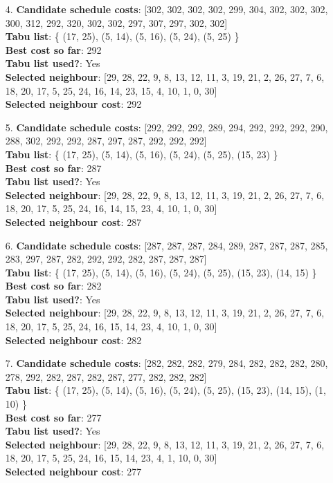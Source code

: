 \documentclass[fleqn]{article}
\begin{document}
\begin{itemize}
    \item[4.] \textbf{Candidate schedule costs}: [302, 302, 302, 302, 299, 304, 302, 302, 302, 300, 312, 292, 320, 302, 302, 297, 307, 297, 302, 302] \\
    \textbf{Tabu list}: \{ (17, 25), (5, 14), (5, 16), (5, 24), (5, 25) \} \\
    \textbf{Best cost so far}: 292 \\
    \textbf{Tabu list used?}: Yes \\
    \textbf{Selected neighbour}: [29, 28, 22, 9, 8, 13, 12, 11, 3, 19, 21, 2, 26, 27, 7, 6, 18, 20, 17, 5, 25, 24, 16, 14, 23, 15, 4, 10, 1, 0, 30] \\
    \textbf{Selected neighbour cost}: 292
      

    \item[5.] \textbf{Candidate schedule costs}: [292, 292, 292, 289, 294, 292, 292, 292, 290, 288, 302, 292, 292, 287, 297, 287, 292, 292, 292] \\
    \textbf{Tabu list}: \{ (17, 25), (5, 14), (5, 16), (5, 24), (5, 25), (15, 23) \} \\
    \textbf{Best cost so far}: 287 \\
    \textbf{Tabu list used?}: Yes \\
    \textbf{Selected neighbour}: [29, 28, 22, 9, 8, 13, 12, 11, 3, 19, 21, 2, 26, 27, 7, 6, 18, 20, 17, 5, 25, 24, 16, 14, 15, 23, 4, 10, 1, 0, 30] \\
    \textbf{Selected neighbour cost}: 287
      

    \item[6.] \textbf{Candidate schedule costs}: [287, 287, 287, 284, 289, 287, 287, 287, 285, 283, 297, 287, 282, 292, 292, 282, 287, 287, 287] \\
    \textbf{Tabu list}: \{ (17, 25), (5, 14), (5, 16), (5, 24), (5, 25), (15, 23), (14, 15) \} \\
    \textbf{Best cost so far}: 282 \\
    \textbf{Tabu list used?}: Yes \\
    \textbf{Selected neighbour}: [29, 28, 22, 9, 8, 13, 12, 11, 3, 19, 21, 2, 26, 27, 7, 6, 18, 20, 17, 5, 25, 24, 16, 15, 14, 23, 4, 10, 1, 0, 30] \\
    \textbf{Selected neighbour cost}: 282
      

    \item[7.] \textbf{Candidate schedule costs}: [282, 282, 282, 279, 284, 282, 282, 282, 280, 278, 292, 282, 287, 282, 287, 277, 282, 282, 282] \\
    \textbf{Tabu list}: \{ (17, 25), (5, 14), (5, 16), (5, 24), (5, 25), (15, 23), (14, 15), (1, 10) \} \\
    \textbf{Best cost so far}: 277 \\
    \textbf{Tabu list used?}: Yes \\
    \textbf{Selected neighbour}: [29, 28, 22, 9, 8, 13, 12, 11, 3, 19, 21, 2, 26, 27, 7, 6, 18, 20, 17, 5, 25, 24, 16, 15, 14, 23, 4, 1, 10, 0, 30] \\
    \textbf{Selected neighbour cost}: 277
      


\end{itemize}
\end{document}
